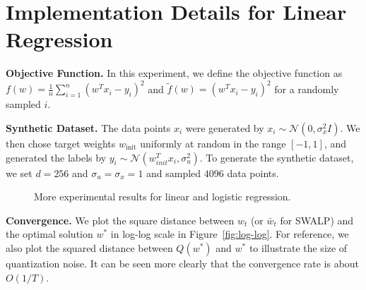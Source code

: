 \section{Implementation Details for Linear Regression}\label{sec:linreg}

\textbf{Objective Function.} 
In this experiment, we define the objective function as $f(w) = \frac{1}{n}\sum_{i=1}^n (w^Tx_i - y_i)^2$ and $\tilde{f}(w) = (w^Tx_i - y_i)^2$ for a randomly sampled $i$.


\textbf{Synthetic Dataset.}
The data points $x_i$ were generated by $x_i \sim \mathcal{N}(0, \sigma_x^2I)$. 
We then chose target weights $w_{\text{init}}$ uniformly at random in the range $[-1, 1]$, and generated the labels by $y_i \sim \mathcal{N}(w_{init}^T x_i, \sigma_u^2)$.
To generate the synthetic dataset, we set $d = 256$ and $\sigma_u = \sigma_x = 1$ and sampled $4096$ data points.

\begin{figure}[t]
    \centering
    \caption{More experimental results for linear and logistic regression.}
\end{figure}


\textbf{Convergence.}
We plot the square distance between $w_t$ (or $\bar w_t$ for SWALP) and the optimal solution $w^*$ in log-log scale in Figure~\ref{fig:log-log}.
For reference, we also plot the squared distance between $Q(w^*)$ and $w^*$ to illustrate the size of quantization noise. It can be seen more clearly that the convergence rate is about $O(1/T)$.


